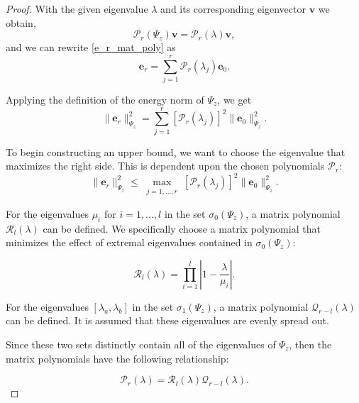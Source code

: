 \documentclass[11p]{elsarticle}
\numberwithin{equation}{section}
\newcommand{\vect}[1]{\ensuremath{\bm{#1}}}
\begin{document}
\begin{proof}
With the given eigenvalue $\lambda$ and its corresponding eigenvector $\vect{v}$ we obtain,
\begin{equation}
\mathcal{P}_r(\Psi_{z})\vect{v}=\mathcal{P}_r(\lambda)\vect{v},
\end{equation}
and we can rewrite \eqref{e_r_mat_poly} as
\begin{equation}
\vect{e}_r= \sum_{j=1}^{r}\mathcal{P}_r(\lambda_j)\vect{e}_0.
\end{equation}

Applying the definition of the energy norm of $\Psi_{z}$, we get
\begin{equation}
    \| \vect{e}_r\|_{\Psi_{z}}^2 = \sum_{j=1}^{r} [\mathcal{P}_r(\lambda_j)]^2 \| \vect{e}_0\|_{\Psi_{z}}^2.
\end{equation}


To begin constructing an upper bound, we want to choose the eigenvalue that maximizes the right side.  This is dependent upon the chosen polynomials $\mathcal{P}_r$:
\begin{equation}
    \| \vect{e}_r\|_{\Psi_{z}}^2 \leq \max\limits_{\substack{j=1,...,r}} [\mathcal{P}_r(\lambda_j)]^2 \| \vect{e}_0\|_{\Psi_{z}}^2.
    \label{eq:constr_upper_bound}
\end{equation}

    For the eigenvalues $\mu_i$ for $i=1,...,l$ in the set $\sigma_0(\Psi_{z})$, a matrix polynomial $\mathcal{R}_l(\lambda)$ can be defined.  We specifically choose a matrix polynomial that minimizes the effect of extremal eigenvalues contained in $\sigma_0(\Psi_{z})$:

    \begin{equation}
    \mathcal{R}_l(\lambda) = \prod_{i=1}^{l} | 1-\frac{\lambda}{\mu_i}|.
    \label{eq: R_l}
    \end{equation}

    For the eigenvalues $[\lambda_a,\lambda_b]$ in the set $\sigma_1(\Psi_{z})$, a matrix polynomial $\mathcal{Q}_{r-l}(\lambda)$ can be defined.  It is assumed that these eigenvalues are evenly spread out.

    Since these two sets distinctly contain all of the eigenvalues of $\Psi_{z}$, then the matrix polynomials have the following relationship:

    \begin{equation}
    \mathcal{P}_r(\lambda) = \mathcal{R}_l(\lambda)\mathcal{Q}_{r-l}(\lambda).
    \end{equation}


\end{proof}
\end{document}
